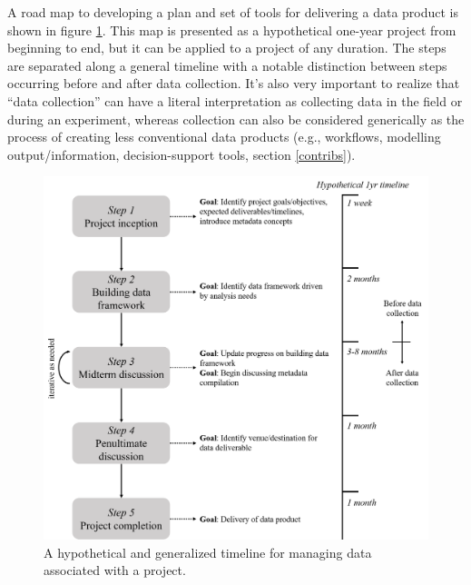 \documentclass[
]{book}
\begin{document}
A road map to developing a plan and set of tools for delivering a data product is shown in figure \ref{fig:dataworkflow}. This map is presented as a hypothetical one-year project from beginning to end, but it can be applied to a project of any duration. The steps are separated along a general timeline with a notable distinction between steps occurring before and after data collection. It's also very important to realize that ``data collection'' can have a literal interpretation as collecting data in the field or during an experiment, whereas collection can also be considered generically as the process of creating less conventional data products (e.g., workflows, modelling output/information, decision-support tools, section \ref{contribs}).

\begin{figure}

{\centering \includegraphics[width=1\linewidth]{img/dataworkflow} 

}

\caption{A hypothetical and generalized timeline for managing data associated with a project.}\label{fig:dataworkflow}
\end{figure}
\end{document}
